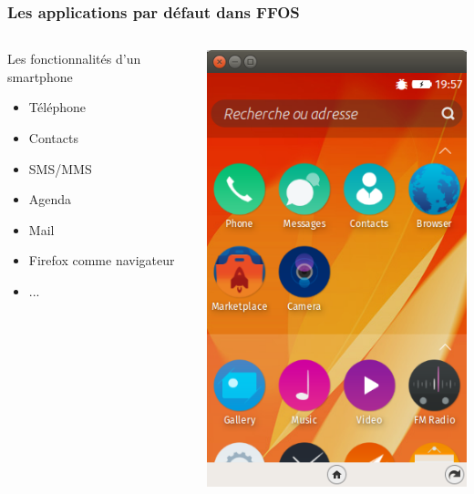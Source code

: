 \documentclass{beamer}
\begin{document}
\begin{frame}
\frametitle{Les applications par défaut dans FFOS}
\begin{columns}[c] 
\begin{block}{Les fonctionnalités d'un smartphone}
\begin{itemize}
\item Téléphone
\item Contacts
\item SMS/MMS
\item Agenda
\item Mail
\item Firefox comme navigateur
\item ...
\end{itemize}
\end{block}
\begin{center}
\includegraphics[scale=0.45]{./images/capture.png} 
\end{center}
\end{columns}
\end{frame}
\end{document}
